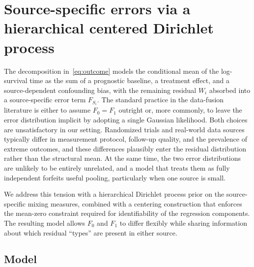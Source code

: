 \documentclass[11pt]{article}
\begin{document}

\section{Source-specific errors via a hierarchical centered Dirichlet process}
\label{sec:hdp}

The decomposition in~\eqref{eq:outcome} models the conditional mean of the log-survival time as the sum of a prognostic baseline, a treatment effect, and a source-dependent confounding bias, with the remaining residual $W_i$ absorbed into a source-specific error term $F_{S_i}$. The standard practice in the data-fusion literature is either to assume $F_0 = F_1$ outright or, more commonly, to leave the error distribution implicit by adopting a single Gaussian likelihood. Both choices are unsatisfactory in our setting. Randomized trials and real-world data sources typically differ in measurement protocol, follow-up quality, and the prevalence of extreme outcomes, and these differences plausibly enter the residual distribution rather than the structural mean. At the same time, the two error distributions are unlikely to be entirely unrelated, and a model that treats them as fully independent forfeits useful pooling, particularly when one source is small.

We address this tension with a hierarchical Dirichlet process \citep{teh2006hierarchical} prior on the source-specific mixing measures, combined with a centering construction \citep{yang2010semiparametric} that enforces the mean-zero constraint required for identifiability of the regression components. The resulting model allows $F_0$ and $F_1$ to differ flexibly while sharing information about which residual ``types'' are present in either source.

\subsection{Model}
\label{sec:hdp-model}
\end{document}
